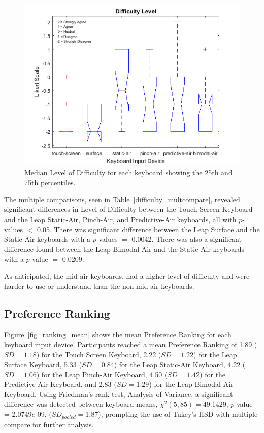\begin{figure}[h]
	\centering
	\includegraphics{fig_difficulty_boxplot}
	\caption[Level of Difficulty Boxplot]{Median Level of Difficulty for each keyboard showing the 25th and 75th percentiles.}
	\label{fig_difficulty_boxplot}
\end{figure}

The multiple comparisons, seen in Table~\ref{difficulty_multcompare}, revealed significant differences in Level of Difficulty between the Touch Screen Keyboard and the Leap Static-Air, Pinch-Air, and Predictive-Air keyboards, all with $p$-values $<$ 0.05. There was significant difference between the Leap Surface and the Static-Air keyboards with a $p$-values $=$ 0.0042. There was also a significant difference found between the Leap Bimodal-Air and the Static-Air keyboards with a $p$-value $=$ 0.0209.

As anticipated, the mid-air keyboards, had a higher level of difficulty and were harder to use or understand than the non mid-air keyboards.

\subsection{Preference Ranking}
Figure~\ref{fig_ranking_mean} shows the mean Preference Ranking for each keyboard input device. Participants reached a mean Preference Ranking of 1.89 ($SD = 1.18$) for the Touch Screen Keyboard, 2.22 ($SD = 1.22$) for the Leap Surface Keyboard, 5.33 ($SD = 0.84$) for the Leap Static-Air Keyboard, 4.22 ($SD = 1.06$) for the Leap Pinch-Air Keyboard, 4.50 ($SD = 1.42$) for the Predictive-Air Keyboard, and 2.83 ($SD = 1.29$) for the Leap Bimodal-Air Keyboard. Using Friedman's rank-test, Analysis of Variance, a significant difference was detected between keyboard means, $\chi^{2}(5, 85) = 49.1429$, $p$-value = 2.0749$e$-09, ($SD_{pooled} = 1.87$), prompting the use of Tukey's HSD with multiple-compare for further analysis.

